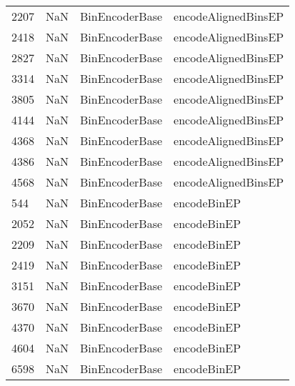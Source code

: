 \begin{tabular}{llll}
2207 &                   NaN &             BinEncoderBase &                       encodeAlignedBinsEP \\
2418 &                   NaN &             BinEncoderBase &                       encodeAlignedBinsEP \\
2827 &                   NaN &             BinEncoderBase &                       encodeAlignedBinsEP \\
3314 &                   NaN &             BinEncoderBase &                       encodeAlignedBinsEP \\
3805 &                   NaN &             BinEncoderBase &                       encodeAlignedBinsEP \\
4144 &                   NaN &             BinEncoderBase &                       encodeAlignedBinsEP \\
4368 &                   NaN &             BinEncoderBase &                       encodeAlignedBinsEP \\
4386 &                   NaN &             BinEncoderBase &                       encodeAlignedBinsEP \\
4568 &                   NaN &             BinEncoderBase &                       encodeAlignedBinsEP \\
544  &                   NaN &             BinEncoderBase &                               encodeBinEP \\
2052 &                   NaN &             BinEncoderBase &                               encodeBinEP \\
2209 &                   NaN &             BinEncoderBase &                               encodeBinEP \\
2419 &                   NaN &             BinEncoderBase &                               encodeBinEP \\
3151 &                   NaN &             BinEncoderBase &                               encodeBinEP \\
3670 &                   NaN &             BinEncoderBase &                               encodeBinEP \\
4370 &                   NaN &             BinEncoderBase &                               encodeBinEP \\
4604 &                   NaN &             BinEncoderBase &                               encodeBinEP \\
6598 &                   NaN &             BinEncoderBase &                               encodeBinEP \\

\end{tabular}
